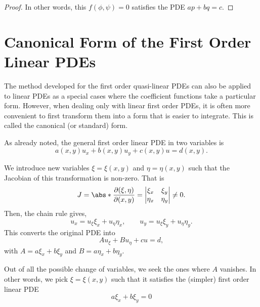 \documentclass[11pt]{penrose}
\begin{document}
\begin{proof}
    In other words, this $f(\phi,\psi) = 0$ satisfies the PDE $ap + bq = c$.



\end{proof}


\section{Canonical Form of the First Order Linear PDEs}
The method developed for the first order quasi-linear PDEs can also be applied to linear PDEs as a special cases where the coefficient functions take a particular form. However, when dealing only with linear first order PDEs, it is often more convenient to first transform them into a form that is easier to integrate. This is called the canonical (or standard) form.

As already noted, the general first order linear PDE in two variables is
\begin{equation}
    a(x,y) u_x + b(x,y) u_y + c(x,y) u = d(x,y).
\end{equation}

We introduce new variables $\xi = \xi(x,y)$ and $\eta = \eta(x,y)$ such that the Jacobian of this transformation is non-zero. That is
\begin{equation}
    J = \abs*{\frac{\pd(\xi, \eta)}{\pd(x,y)}} =
    \begin{vmatrix}
        \xi_x & \xi_y \\ \eta_x & \eta_y
    \end{vmatrix}
    \neq 0.
\end{equation}
Then, the chain rule gives,
\begin{equation}
    u_x = u_\xi \xi_x + u_\eta \eta_x,
    \qquad
    u_y = u_\xi \xi_y + u_\eta \eta_y.
\end{equation}
This converts the original PDE into
\begin{equation}
    A u_\xi + B u_\eta + cu = d,
\end{equation}
with $A = a \xi_x + b \xi_y$ and $B = a \eta_x + b \eta_y$.

Out of all the possible change of variables, we seek the ones where $A$ vanishes. In other words, we pick $\xi = \xi(x,y)$ such that it satisfies the (simpler) first order linear PDE
\begin{equation}
    a \xi_x + b \xi_y = 0
\end{equation}
\end{document}
